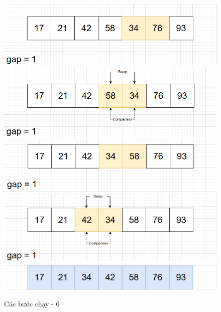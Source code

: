 \begin{figure}[H]
    \centering
    \includegraphics[width=1\linewidth]{img/shell_sort/21.png}
    \vspace{0.15mm}
    \includegraphics[width=1\linewidth]{img/shell_sort/22.png}
    \vspace{0.15mm}
    \includegraphics[width=1\linewidth]{img/shell_sort/23.png}
    \vspace{0.15mm}
    \includegraphics[width=1\linewidth]{img/shell_sort/24.png}
    \vspace{0.15mm}
    \includegraphics[width=1\linewidth]{img/shell_sort/25.png}
    \caption{Các bước chạy - 6}
    \label{fig:part6}
\end{figure}

